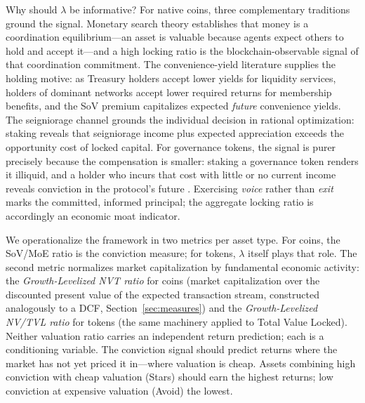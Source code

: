 \documentclass[12pt]{article}
\begin{document}
Why should $\lambda$ be informative? For native coins, three complementary traditions
ground the signal. Monetary search theory \citep{kiyotaki1993search, lagos2005unified}
establishes that money is a coordination equilibrium---an asset is valuable because
agents expect others to hold and accept it---and a high locking ratio is the
blockchain-observable signal of that coordination commitment. The convenience-yield
literature \citep{sockin2020model, krishnamurthy2012aggregate, nagel2016liquidity}
supplies the holding motive: as Treasury holders accept lower yields for liquidity
services, holders of dominant networks accept lower required returns for membership
benefits, and the SoV premium capitalizes expected \textit{future} convenience yields.
The seigniorage channel \citep{cong2024staking} grounds the individual decision in
rational optimization: staking reveals that seigniorage income plus expected
appreciation exceeds the opportunity cost of locked capital. For governance tokens,
the signal is purer precisely because the compensation is smaller: staking a
governance token renders it illiquid, and a holder who incurs that cost with little or
no current income reveals conviction in the protocol's future
\citep{spence1973job}. Exercising \textit{voice} rather than \textit{exit}
\citep{hirschman1970exit, edmans2011governance} marks the committed, informed
principal; the aggregate locking ratio is accordingly an economic moat indicator.

We operationalize the framework in two metrics per asset type. For coins, the SoV/MoE
ratio is the conviction measure; for tokens, $\lambda$ itself plays that role. The
second metric normalizes market capitalization by fundamental economic activity: the
\textit{Growth-Levelized NVT ratio} for coins (market capitalization over the
discounted present value of the expected transaction stream, constructed analogously
to a DCF, Section~\ref{sec:measures}) and the \textit{Growth-Levelized NV/TVL ratio}
for tokens (the same machinery applied to Total Value Locked). Neither valuation ratio
carries an independent return prediction; each is a conditioning variable. The
conviction signal should predict returns where the market has not yet priced it
in---where valuation is cheap. Assets combining high conviction with cheap valuation
(Stars) should earn the highest returns; low conviction at expensive valuation (Avoid)
the lowest.
\end{document}
